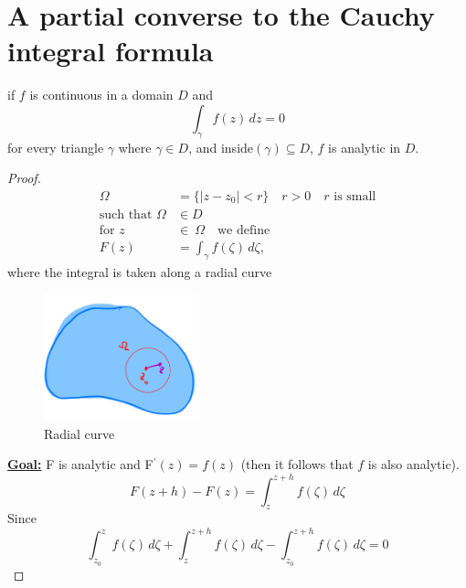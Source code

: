 \section{A partial converse to the Cauchy integral formula}
\begin{theorem}
    if $f$ is continuous in a domain $D$ and
    \begin{equation*}
        \int_{\gamma} f(z) \, dz = 0
    \end{equation*}
    for every triangle $\gamma$ where $\gamma \in D$, and inside$(\gamma) \subseteq D$, $f$ is analytic in $D$.
\end{theorem}
\begin{proof}
    \begin{align*}
        \Omega                   & = \{|z-z_0| < r\} \quad r > 0 \quad r\text{ is small} \\
        \text{such that } \Omega & \in D                                                 \\
        \text{for } z            & \in \ \Omega \quad \text{we define}                   \\
        F(z)                     & = \int_{\gamma} f(\zeta) \, d\zeta,
    \end{align*}
    where the integral is taken along a radial curve
    \begin{figure}[H]
        \centering
        \includegraphics[width=0.4\textwidth]{./LECTURE_9/D.png}
        \caption{Radial curve}
        \label{fig:Radial curve}
    \end{figure}
    \textbf{\underline{Goal:}} F is analytic and F$^{\prime}(z) = f(z)$ (then it follows that $f$ is also analytic).
    \begin{equation*}
        F(z + h) - F(z) = \int_{z}^{z+h} f(\zeta) \, d\zeta
    \end{equation*}
    Since
    \begin{equation*}
        \int_{z_0}^{z} f(\zeta) \, d\zeta + \int_{z}^{z+h} f(\zeta) \, d\zeta - \int_{z_0}^{z+h} f(\zeta) \, d\zeta = 0
    \end{equation*}

\end{proof}
